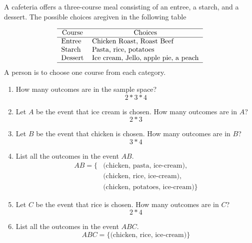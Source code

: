 \item  A cafeteria offers a three-course meal consisting of an entree, a starch, and a dessert. The possible choices aregiven in the following table

\[
{
\begin{tabular}{ll}
    \hline
    \multicolumn{1}{c}{Course} & \multicolumn{1}{c}{Choices} \\
    \hline
    Entree & Chicken Roast, Roast Beef\\
    Starch & Pasta, rice, potatoes\\
    Dessert & Ice cream, Jello, apple pie, a peach\\
    \hline
\end{tabular}
}
\]
A person is to choose one course from each category.
\begin{enumerate}
    \item How many outcomes are in the sample space?
    \[ 2 * 3 * 4 \]
    \item Let $A$ be the event that ice cream is chosen. How many outcomes are in $A$?
    \[ 2 * 3 \]
    \item Let $B$ be the event that chicken is chosen. How many outcomes are in $B$?
    \[ 3 * 4 \]
    \item List all the outcomes in the event $AB$.
    \begin{align*}
        AB = \{ &\text{(chicken, pasta, ice-cream)},\\
        &\text{(chicken, rice, ice-cream)},\\
        &\text{(chicken, potatoes, ice-cream)} \}
    \end{align*}
    \item Let $C$ be the event that rice is chosen. How many outcomes are in $C$?
    \[ 2 * 4 \]
    \item List all the outcomes in the event $ABC$.
    \[ ABC = \{ \text{(chicken, rice, ice-cream)} \} \]
\end{enumerate}
